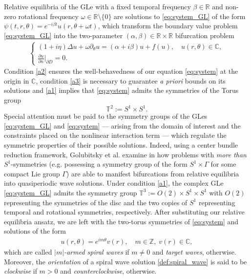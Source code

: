 \documentclass[11pt]{amsart}
\def\bc{{\mathbb{C}}}
\def\br{{\mathbb{R}}}
\def\bz{{\mathbb{Z}}}
\def\bt{{\mathbb{T}}}
\def\br{\mathbb R}
\begin{document}
Relative equilibria of the GLe with a fixed temporal frequency $\beta \in \br$ and non-zero rotational frequency $\omega \in \br \setminus \{0\}$ are  solutions to \eqref{eq:system_GL} of the form $\psi(t,r,\theta) = e^{-i\beta t}u(r,\theta+ \omega t)$, which transform the boundary value problem \eqref{eq:system_GL} into the two-parameter $(\alpha,\beta) \in \br \times \br$ bifurcation problem 
\begin{align} \label{eq:system}
\begin{cases}
(1+i\eta)\Delta u + \omega \partial_\theta u = (\alpha + i \beta)u + f(u), \quad u(r,\theta) \in \bc,  \\
\frac{\partial u}{\partial n}|_{\partial D} = 0.  
\end{cases}
\end{align}
Condition \ref{a2} 
ensures the well-behavedness of our equation \eqref{eq:system}
at the origin in $\bc$, condition \ref{a3} is necessary to guarantee {\it a priori} bounds on its solutions and \ref{a1} implies that \eqref{eq:system} admits the symmetries of the Torus group
\[
\bt^2 := S^1 \times S^1.
\]
Special attention must be paid to the symmetry groups of the GLes \eqref{eq:system_GL} and \eqref{eq:system} --- arising from the domain of interest and the constraints placed on the nonlinear interaction term --- which regulate the symmetric properties of their possible solutions. Indeed, using a center bundle reduction framework, Golubitsky et al. examine in \cite{Golubitsky} how problems with {\it more than} $S^1$-symmetries (e.g. possessing a symmetry group of the form $S^1 \times \Gamma$ for some compact Lie group $\Gamma$) are able to manifest bifurcations from relative equilibria into quasiperiodic wave solutions. Under condition \ref{a1}, the complex GLe \eqref{eq:system_GL} admits the symmetry group $\bt^3 := O(2) \times S^1 \times S^1$ with $O(2)$ representing the symmetries of the disc and the two copies of $S^1$ representing temporal and rotational symmetries, respectively. After substituting our relative equilibria ansatz, we are left with the two-torus symmetries of \eqref{eq:system} and solutions of the form
\begin{align} \label{def:spiral_wave}
 u(r,\theta) = e^{im \theta} v(r), \quad m \in \bz, \; v(r) \in \bc,
\end{align}
which are called {\it $|m|$-armed spiral waves} if $m \neq 0$ and {\it target waves}, otherwise. Moreover, the {\it orientation} of a spiral wave solution \eqref{def:spiral_wave}
is said to be {\it clockwise} if $m > 0$ and {\it counterclockwise}, otherwise. 
\end{document}
